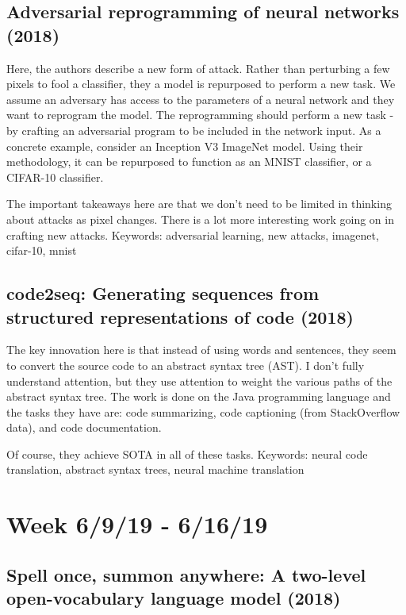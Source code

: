 \documentclass{article}
\begin{document}
\subsection*{Adversarial reprogramming of neural networks (2018)\cite{elsayed2018adversarial}}

Here, the authors describe a new form of attack. Rather than perturbing a few pixels to fool a classifier, they a model is repurposed to perform a new task. We assume an adversary has access to the parameters of a neural network and they want to reprogram the model. The reprogramming should perform a new task - by crafting an adversarial program to be included in the network input. As a concrete example, consider an Inception V3 ImageNet model. Using their methodology, it can be repurposed to function as an MNIST classifier, or a CIFAR-10 classifier.

The important takeaways here are that we don't need to be limited in thinking about attacks as pixel changes. There is a lot more interesting work going on in crafting new attacks.
\newline\newline
Keywords: adversarial learning, new attacks, imagenet, cifar-10, mnist

\subsection*{code2seq: Generating sequences from structured representations of code (2018)\cite{alon2018code2seq}}

The key innovation here is that instead of using words and sentences, they seem to convert the source code to an abstract syntax tree (AST). I don't fully understand attention, but they use attention to weight the various paths of the abstract syntax tree. The work is done on the Java programming language and the tasks they have are: code summarizing, code captioning (from StackOverflow data), and code documentation.

Of course, they achieve SOTA in all of these tasks.
\newline\newline
Keywords: neural code translation, abstract syntax trees, neural machine translation


\section*{Week 6/9/19 - 6/16/19}
\subsection*{Spell once, summon anywhere: A two-level open-vocabulary language model (2018)\cite{mielke2018spell}}
\end{document}
